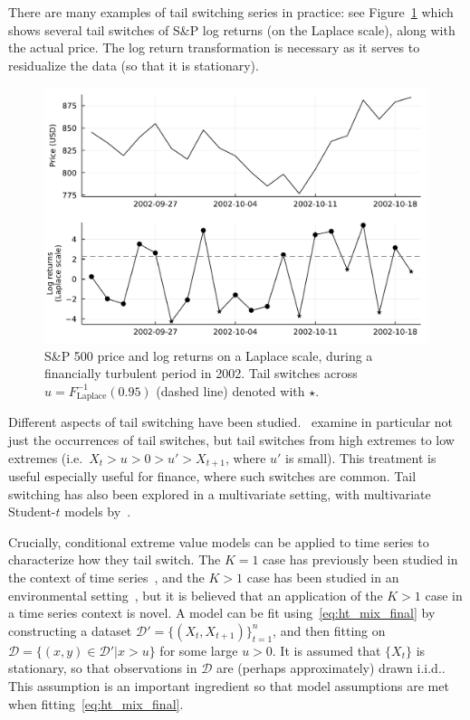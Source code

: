 \documentclass[11pt,twoside,openany]{book}
\newcommand{\D}{\mathcal{D}}
\numberwithin{Theorem}{chapter}
\numberwithin{Definition}{chapter}
\numberwithin{Lemma}{chapter}
\numberwithin{Algorithm}{chapter}
\numberwithin{equation}{chapter}
\begin{document}
There are many examples of tail switching series in practice:
see Figure~\ref{fig:sap500ts} which shows several tail switches of S\&P log returns
(on the Laplace scale), along with the actual price.
The log return transformation is necessary as it serves to residualize the
data (so that it is stationary).
\begin{figure}[htp]
  \centering
  \includegraphics[scale=0.70]{../tail-switching/figures/spy_tail_switch.pdf}
  \caption{S\&P 500 price and log returns on a Laplace scale, during a financially turbulent period in 2002.
  Tail switches across $u=F_{\text{Laplace}}^{-1}(0.95)$ (dashed line) denoted with $\star$.}\label{fig:sap500ts}
\end{figure}

Different aspects of tail switching have been
studied.~\cite{bortot2003extremes} examine in particular not just the
occurrences of tail switches, but tail switches from high extremes to low
extremes (i.e.\ $X_t > u > 0 > u' > X_{t+1}$, where $u'$ is small). This
treatment is useful especially useful for finance, where such switches are
common. Tail switching has also been explored in a multivariate setting,
with multivariate Student-$t$ models by~\cite{bernardi2013multivariate}.

Crucially, conditional extreme value models can be applied to time series to
characterize how they tail switch.
The $K=1$ case has previously been studied in the context of time series~\citep{auldphdthesis},
and the $K>1$ case has been studied in an environmental setting~\citep{tendijck2021modeling},
but it is believed that an application of the $K>1$ case in a time series context is novel.
A model can be fit using~\eqref{eq:ht_mix_final} by constructing a dataset $\D' =
\{(X_{t}, X_{t+1})\}_{t=1}^n$, and then fitting on $\D = \{(x,y) \in \D' | x > u\}$ for some large $u>0$.
It is assumed that $\{X_t\}$ is stationary, so that observations in $\D$ are (perhaps approximately) drawn i.i.d.. This assumption is an important ingredient so that model assumptions are met when fitting~\eqref{eq:ht_mix_final}.
\end{document}
